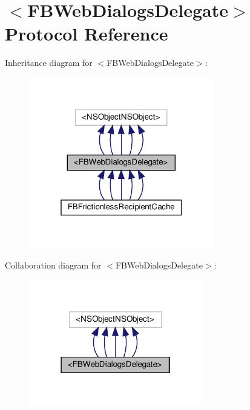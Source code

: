 \hypertarget{protocolFBWebDialogsDelegate-p}{}\section{$<$F\+B\+Web\+Dialogs\+Delegate$>$ Protocol Reference}
\label{protocolFBWebDialogsDelegate-p}


Inheritance diagram for $<$F\+B\+Web\+Dialogs\+Delegate$>$\+:
\nopagebreak
\begin{figure}[H]
\begin{center}
\leavevmode
\includegraphics[width=229pt]{protocolFBWebDialogsDelegate-p__inherit__graph}
\end{center}
\end{figure}


Collaboration diagram for $<$F\+B\+Web\+Dialogs\+Delegate$>$\+:
\nopagebreak
\begin{figure}[H]
\begin{center}
\leavevmode
\includegraphics[width=214pt]{protocolFBWebDialogsDelegate-p__coll__graph}
\end{center}
\end{figure}
